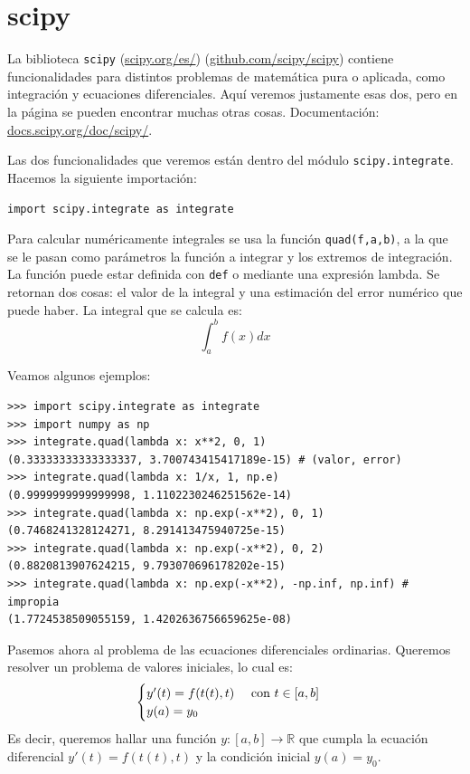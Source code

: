 \documentclass[a4paper, 12pt]{report}
\newcommand{\R}{\mathbb{R}}
\newcommand{\te}{\text}
\theoremstyle{definition}
\begin{document}
\section{scipy}

La biblioteca {\tt scipy} (\href{https://scipy.org/es/}{scipy.org/es/}) (\href{https://github.com/scipy/scipy}{github.com/scipy/scipy}) contiene funcionalidades para distintos problemas de matemática pura o aplicada, como integración y ecuaciones diferenciales. Aquí veremos justamente esas dos, pero en la página se pueden encontrar muchas otras cosas. Documentación: \href{https://docs.scipy.org/doc/scipy/}{docs.scipy.org/doc/scipy/}.

Las dos funcionalidades que veremos están dentro del módulo {\tt scipy.integrate}. Hacemos la siguiente importación:

\centerline{\tt import scipy.integrate as integrate}

Para calcular numéricamente integrales se usa la función {\tt quad(f,a,b)}, a la que se le pasan como parámetros la función a integrar y los extremos de integración. La función puede estar definida con {\tt def} o mediante una expresión lambda. Se retornan dos cosas: el valor de la integral y una estimación del error numérico que puede haber. La integral que se calcula es:
$$\int_a^bf(x)dx
$$


Veamos algunos ejemplos:
\begin{verbatim}
>>> import scipy.integrate as integrate
>>> import numpy as np
>>> integrate.quad(lambda x: x**2, 0, 1)
(0.33333333333333337, 3.700743415417189e-15) # (valor, error)
>>> integrate.quad(lambda x: 1/x, 1, np.e)
(0.9999999999999998, 1.1102230246251562e-14)
>>> integrate.quad(lambda x: np.exp(-x**2), 0, 1)
(0.7468241328124271, 8.291413475940725e-15)
>>> integrate.quad(lambda x: np.exp(-x**2), 0, 2)
(0.8820813907624215, 9.793070696178202e-15)
>>> integrate.quad(lambda x: np.exp(-x**2), -np.inf, np.inf) # impropia
(1.7724538509055159, 1.4202636756659625e-08)
\end{verbatim}

Pasemos ahora al problema de las ecuaciones diferenciales ordinarias. Queremos resolver un problema de valores iniciales, lo cual es:
$$\begin{cases}
	y'(t) = f(t(t),t)  \quad\te{ con }t\in[a,b]\cr
	y(a) = y_0 
\end{cases}
$$
Es decir, queremos hallar una función $y:[a,b]\to \R$ que cumpla la ecuación diferencial $y'(t) = f(t(t),t)$ y la condición inicial $y(a) = y_0$.
\end{document}
